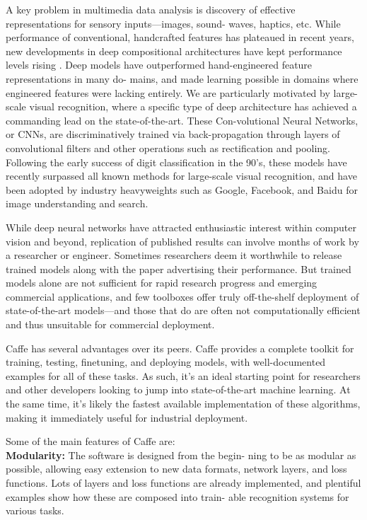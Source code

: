 A key problem in multimedia data analysis is discovery of effective representations for sensory inputs—images, sound- waves, haptics, etc. While performance of conventional, handcrafted features has plateaued in recent years, new developments in deep compositional architectures have kept performance levels rising \cite{krizhevsky}. Deep models have outperformed hand-engineered feature representations in many do- mains, and made learning possible in domains where engineered features were lacking entirely.
We are particularly motivated by large-scale visual recognition, where a specific type of deep architecture has achieved a commanding lead on the state-of-the-art. These Con-volutional Neural Networks, or CNNs, are discriminatively trained via back-propagation through layers of convolutional filters and other operations such as rectification and pooling. Following the early success of digit classification in the 90’s, these models have recently surpassed all known methods for large-scale visual recognition, and have been adopted by industry heavyweights such as Google, Facebook, and Baidu for image understanding and search.

While deep neural networks have attracted enthusiastic interest within computer vision and beyond, replication of published results can involve months of work by a researcher or engineer. Sometimes researchers deem it worthwhile to release trained models along with the paper advertising their performance. But trained models alone are not sufficient for rapid research progress and emerging commercial applications, and few toolboxes offer truly off-the-shelf deployment of state-of-the-art models—and those that do are often not computationally efficient and thus unsuitable for commercial deployment.

Caffe has several advantages over its peers. Caffe provides a complete toolkit for training, testing, finetuning, and deploying models, with well-documented examples for all of these tasks. As such, it’s an ideal starting point for researchers and other developers looking to jump into state-of-the-art machine learning. At the same time, it’s likely the fastest available implementation of these algorithms, making it immediately useful for industrial deployment.

Some of the main features of Caffe are:\\
\textbf{Modularity:} The software is designed from the begin- ning to be as modular as possible, allowing easy extension to new data formats, network layers, and loss functions. Lots of layers and loss functions are already implemented, and plentiful examples show how these are composed into train- able recognition systems for various tasks. \\

